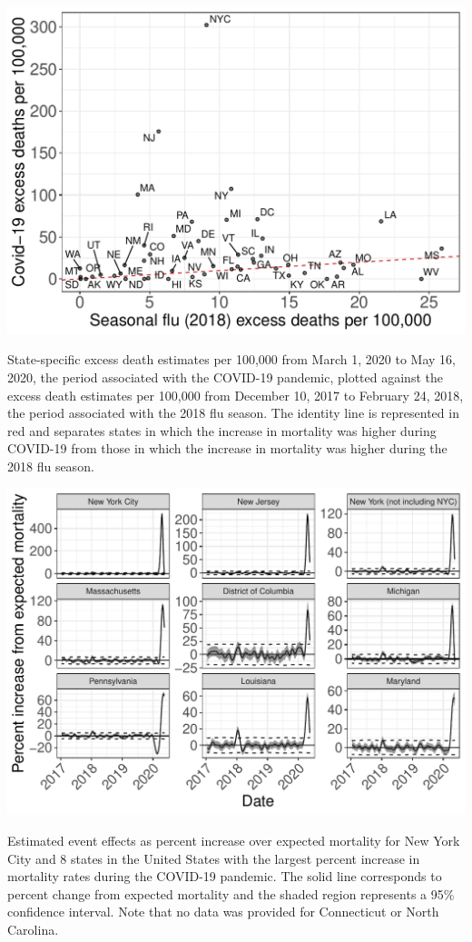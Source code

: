 \documentclass[11pt]{article}
\begin{document}
\begin{suppfigure}[ht]
	\centering
	\includegraphics[width=1\linewidth]{figs/supp-figure-covidVflu-rates.pdf} 
	\caption{State-specific excess death estimates per 100,000 from March 1, 2020 to May 16, 2020, the period associated with the COVID-19 pandemic, plotted against the excess death estimates per 100,000 from December 10, 2017 to February 24, 2018, the period associated with the 2018 flu season. The identity line is represented in red and separates states in which the increase in mortality was higher during COVID-19 from those in which the increase in mortality was higher during the 2018 flu season.}
	\label{supp-fig:covid-v-flu}
\end{suppfigure}

\begin{suppfigure}[ht]
	\centering
	\includegraphics[width=1\linewidth]{figs/supp-figure-4.pdf} 
	\caption{Estimated event effects as percent increase over expected mortality for New York City and 8 states in the United States with the largest percent increase in mortality rates during the COVID-19 pandemic. The solid line corresponds to percent change from expected mortality and the shaded region represents a 95\% confidence interval. Note that no data was provided for Connecticut or North Carolina.}
	\label{supp-fig:covid19-states}
\end{suppfigure}
\end{document}
